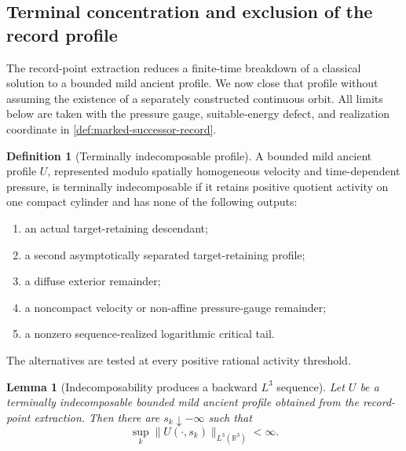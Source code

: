 \documentclass[11pt]{amsart}
\numberwithin{equation}{section}
\theoremstyle{plain}
\newtheorem{lemma}[lemma]{Lemma}
\theoremstyle{definition}
\newtheorem{definition}[definition]{Definition}
\theoremstyle{remark}
\begin{document}
\subsection{Terminal concentration and exclusion of the record profile}
\label{app:terminal-record-exclusion}

The record-point extraction reduces a finite-time breakdown of a classical
solution to a bounded mild ancient profile.  We now close that profile without
assuming the existence of a separately constructed continuous orbit.  All
limits below are taken with the pressure gauge, suitable-energy defect, and
realization coordinate in \cref{def:marked-successor-record}.

\begin{definition}[Terminally indecomposable profile]
\label{def:terminally-indecomposable-profile}
A bounded mild ancient profile \(U\), represented modulo spatially homogeneous
velocity and time-dependent pressure, is terminally indecomposable if it
retains positive quotient activity on one compact cylinder and has none of the
following outputs:
\begin{enumerate}[label=\textup{(A\arabic*)},leftmargin=2.8em]
\item an actual target-retaining descendant;
\item a second asymptotically separated target-retaining profile;
\item a diffuse exterior remainder;
\item a noncompact velocity or non-affine pressure-gauge remainder;
\item a nonzero sequence-realized logarithmic critical tail.
\end{enumerate}
The alternatives are tested at every positive rational activity threshold.
\end{definition}

\begin{lemma}[Indecomposability produces a backward \(L^3\) sequence]
\label{lem:indecomposable-backward-L3}
Let \(U\) be a terminally indecomposable bounded mild ancient profile obtained
from the record-point extraction.  Then there are \(s_k\downarrow-\infty\)
such that
\begin{equation}\label{eq:indecomposable-backward-L3}
 \sup_k\|U(\cdot,s_k)\|_{L^3(\mathbb R^3)}<\infty.
\end{equation}
\end{lemma}
\end{document}
